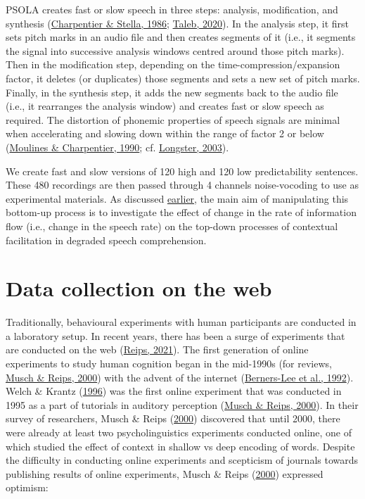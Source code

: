 \documentclass[a4paper, nobind]{templates/ociamthesis}
\begin{document}
PSOLA creates fast or slow speech in three steps: analysis, modification, and synthesis (\protect\hyperlink{ref-Charpentier1986}{Charpentier \& Stella, 1986}; \protect\hyperlink{ref-Taleb2020}{Taleb, 2020}).
In the analysis step, it first sets pitch marks in an audio file and then creates segments of it
(i.e., it segments the signal into successive analysis windows centred around those pitch marks).
Then in the modification step, depending on the time-compression/expansion factor, it deletes (or duplicates) those segments and sets a new set of pitch marks.
Finally, in the synthesis step, it adds the new segments back to the audio file (i.e., it rearranges the analysis window) and creates fast or slow speech as required.
The distortion of phonemic properties of speech signals are minimal when accelerating and slowing down within the range of factor 2 or below (\protect\hyperlink{ref-Moulines1990}{Moulines \& Charpentier, 1990}; cf. \protect\hyperlink{ref-Longster2003}{Longster, 2003}).

We create fast and slow versions of 120 high and 120 low predictability sentences.
These 480 recordings are then passed through 4 channels noise-vocoding to use as experimental materials.
As discussed \protect\hyperlink{research-goals}{earlier}, the main aim of manipulating this bottom-up process is to investigate the effect of change in the rate of information flow (i.e., change in the speech rate) on the top-down processes of contextual facilitation in degraded speech comprehension.

\hypertarget{data-collection-on-the-web}{%
\section{Data collection on the web}\label{data-collection-on-the-web}}

Traditionally, behavioural experiments with human participants are conducted in a laboratory setup.
In recent years, there has been a surge of experiments that are conducted on the web (\protect\hyperlink{ref-Reips2021}{Reips, 2021}).
The first generation of online experiments to study human cognition began in the mid-1990s (for reviews, \protect\hyperlink{ref-Musch2000}{Musch \& Reips, 2000}) with the advent of the internet (\protect\hyperlink{ref-Bernerslee1992}{Berners-Lee et al., 1992}).
Welch \& Krantz (\protect\hyperlink{ref-Welch1996}{1996}) was the first online experiment that was conducted in 1995 as a part of tutorials in auditory perception (\protect\hyperlink{ref-Musch2000}{Musch \& Reips, 2000}).
In their survey of researchers, Musch \& Reips (\protect\hyperlink{ref-Musch2000}{2000}) discovered that until 2000, there were already at least two psycholinguistics experiments conducted online,
one of which studied the effect of context in shallow vs deep encoding of words.
Despite the difficulty in conducting online experiments and scepticism of journals towards publishing results of online experiments,
Musch \& Reips (\protect\hyperlink{ref-Musch2000}{2000}) expressed optimism:
\end{document}
